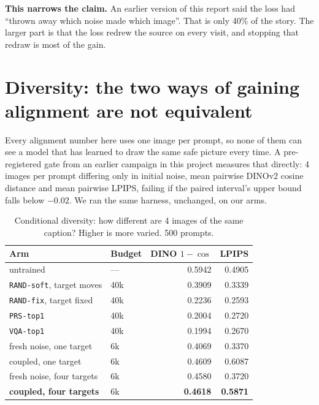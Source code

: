 \documentclass[11pt]{article}
\newcommand{\obs}[1]{\textcolor{obsblue}{#1}}
\newcommand{\bad}[1]{\textcolor{badred}{#1}}
\begin{document}
\textbf{This narrows the claim.} An earlier version of this report said the loss had ``thrown away
which noise made which image''. That is only \obs{40\%} of the story. The larger part is that the
loss redrew the source on every visit, and stopping that redraw is most of the gain.

\section{Diversity: the two ways of gaining alignment are not equivalent}
\label{sec:diversity}

Every alignment number here uses one image per prompt, so none of them can see a model that has
learned to draw the same safe picture every time. A pre-registered gate from an earlier campaign in
this project measures that directly: \obs{4} images per prompt differing only in initial noise, mean
pairwise DINOv2 cosine distance and mean pairwise LPIPS, failing if the paired interval's upper
bound falls below \obs{$-0.02$}. We ran the same harness, unchanged, on our arms.

\begin{table}[h]
\centering
\caption{Conditional diversity: how different are \obs{4} images of the same caption? Higher is more
varied. \obs{500} prompts.}
\label{tab:diversity}
\small
\begin{tabular}{@{}llrr@{}}
\toprule
Arm & Budget & DINO $1-\cos$ & LPIPS \\
\midrule
untrained & --- & \obs{0.5942} & \obs{0.4905} \\
\midrule
\texttt{RAND-soft}, target moves & \obs{40}k & \obs{0.3909} & \obs{0.3339} \\
\texttt{RAND-fix}, target fixed & \obs{40}k & \bad{0.2236} & \bad{0.2593} \\
\texttt{PRS-top1} & \obs{40}k & \bad{0.2004} & \obs{0.2720} \\
\texttt{VQA-top1} & \obs{40}k & \bad{0.1994} & \obs{0.2670} \\
\midrule
fresh noise, one target & \obs{6}k & \obs{0.4069} & \obs{0.3370} \\
coupled, one target & \obs{6}k & \obs{0.4609} & \obs{0.6087} \\
fresh noise, four targets & \obs{6}k & \obs{0.4580} & \obs{0.3720} \\
\textbf{coupled, four targets} & \obs{6}k & \obs{\textbf{0.4618}} & \obs{\textbf{0.5871}} \\
\bottomrule
\end{tabular}
\end{table}
\end{document}

